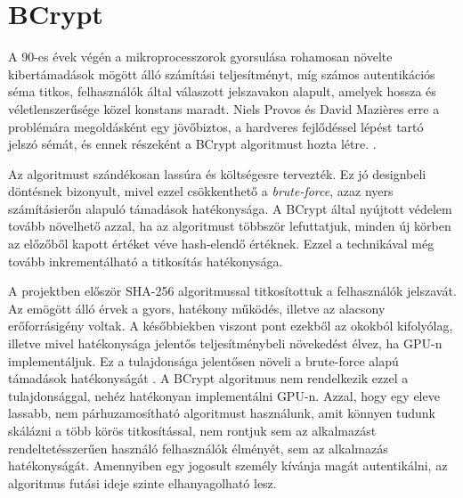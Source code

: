 \section{BCrypt}

A 90-es évek végén a mikroprocesszorok gyorsulása rohamosan növelte kibertámadások mögött álló számítási teljesítményt, míg számos autentikációs séma titkos, felhasználók által válaszott jelszavakon alapult, amelyek hossza és véletlenszerűsége közel konstans maradt. Niels Provos és David Mazières erre a problémára megoldásként egy jövőbiztos, a hardveres fejlődéssel lépést tartó jelszó sémát, és ennek részeként a BCrypt algoritmust hozta létre. \cite{provos1999future}. \par

Az algoritmust szándékosan lassúra és költségesre tervezték. Ez jó designbeli döntésnek bizonyult, mivel ezzel csökkenthető a \emph{brute-force}, azaz nyers számításierőn alapuló támadások hatékonysága. A BCrypt által nyújtott védelem tovább növelhető azzal, ha az algoritmust többször lefuttatjuk, minden új körben az előzőből kapott értéket véve hash-elendő értéknek. Ezzel a technikával még tovább inkrementálható a titkosítás hatékonysága. \par

A projektben először SHA-256 algoritmussal titkosítottuk a felhasználók jelszavát. Az emögött álló érvek a gyors, hatékony működés, illetve az alacsony erőforrásigény voltak. A későbbiekben viszont pont ezekből az okokból kifolyólag, illetve mivel hatékonysága jelentős teljesítménybeli növekedést élvez, ha GPU-n implementáljuk. Ez a tulajdonsága jelentősen növeli a brute-force alapú támadások hatékonyságát \cite{patra2021cryptography}. A BCrypt algoritmus nem rendelkezik ezzel a tulajdonsággal, nehéz hatékonyan implementálni GPU-n. Azzal, hogy egy eleve lassabb, nem párhuzamosítható algoritmust használunk, amit könnyen tudunk skálázni a több körös titkosítással, nem rontjuk sem az alkalmazást rendeltetésszerűen használó felhasználók élményét, sem az alkalmazás hatékonyságát. Amennyiben egy jogosult személy kívánja magát autentikálni, az algoritmus futási ideje szinte elhanyagolható lesz. \par